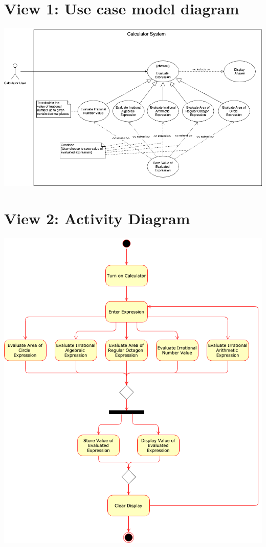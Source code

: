 \section{View 1: Use case model diagram}
\includegraphics[width=1.0\textwidth]{images/usecasemodel.png}

\section{View 2: Activity Diagram}
\includegraphics[width=1.0\textwidth]{images/activitydiagram.png}

